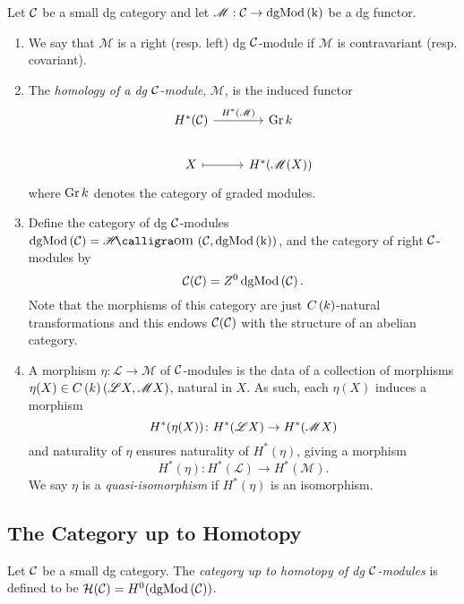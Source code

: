 \documentclass[dissertation.tex]{subfiles}
\begin{document}
\begin{defn}
  Let $\mathcal{C}$ be a small dg category and let $\mathscr{M} : \mathcal{C} \rightarrow \operatorname{dgMod\left(k\right)}$ be a dg functor.
  \begin{enumerate}
  \item
    We say that $\mathscr{M}$ is a right (resp. left) dg $\mathcal{C}$-module if $\mathscr{M}$ is contravariant (resp. covariant).
  \item
    The {\it homology of a dg $\mathcal{C}$-module}, $\mathscr{M}$, is the induced functor
    $$\begin{tikzcd}
      H^\ast(\C) \arrow{r}{H^\ast(\mathscr{M})}& \Gr{k}\\
      X \arrow[mapsto]{r} & H^\ast(\mathscr{M}(X))
    \end{tikzcd}$$
    where $\operatorname{Gr}k$ denotes the category of graded modules.
  \item
    Define the category of dg $\mathcal{C}$-modules $\cdg{\C} = \SHom{\C, \cdg{k}}$, and the category of right $\mathcal{C}$-modules by
    $$\mathcal{C}(\mathcal{C}) = Z^0 \operatorname{dgMod\left(\mathcal{C}\right)}.$$
    Note that the morphisms of this category are just $C\left(k\right)$-natural transformations and this endows $\mathcal{C}(\mathcal{C})$ with the structure of an abelian category.
  \item
    A morphism $\eta \colon \mathscr{L} \rightarrow \mathscr{M}$ of $\mathcal{C}$-modules is the data of a collection of morphisms $\eta(X) \in C\left(k\right)(\mathscr{L}X,\mathscr{M}X)$, natural in $X$.
    As such, each $\eta(X)$ induces a morphism
    $$H^\ast(\eta(X)) \colon H^\ast(\mathscr{L}X) \to H^\ast(\mathscr{M}X)$$
    and naturality of $\eta$ ensures naturality of $H^\ast(\eta)$, giving a morphism
    $$H^\ast(\eta) \colon H^\ast(\mathscr{L}) \rightarrow H^\ast(\mathscr{M}).$$
    We say $\eta$ is a {\it quasi-isomorphism} if $H^\ast(\eta)$ is an isomorphism.
  \end{enumerate}
\end{defn}

\subsection{The Category up to Homotopy}
\begin{defn}
  Let $\mathcal{C}$ be a small dg category.
  The {\it category up to homotopy of dg $\mathcal{C}$-modules} is defined to be $\mathcal{H}(\mathcal{C}) = H^0(\operatorname{dgMod\left(\mathcal{C}\right)})$.
\end{defn}
\end{document}
